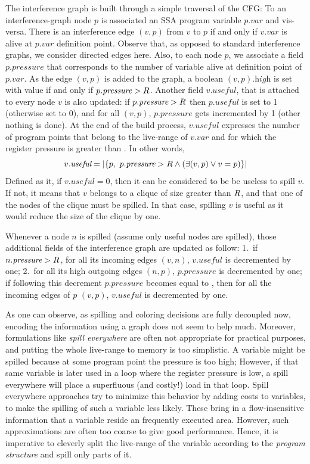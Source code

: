 {The interference graph is built through a simple traversal of the CFG: 
To an interference-graph node $p$ is associated an SSA program variable $p.\textit{var}$ and vis-versa. 
There is an interference edge $(v,p)$ from $v$ to $p$ if and only if $v.\textit{var}$ is alive at $p.\textit{var}$ definition point. 
Observe that, as opposed to standard interference graphs, we consider directed edges here. 
Also, to each node $p$, we associate a field $p.\textit{pressure}$ that corresponds to the number of variable alive at definition point of $p.\textit{var}$. 
As the edge $(v,p)$ is added to the graph, a boolean $(v,p).\textit{high}$ is set with value \true if and only if $p.\textit{pressure}>R$. 
Another field $v.\textit{useful}$, that is attached to every node $v$ is also updated: 
if $p.\textit{pressure}>R$ then $p.\textit{useful}$ is set to 1 (otherwise set to 0), and for all $(v,p)$, $p.\textit{pressure}$ gets incremented by 1 (other nothing is done). 
At the end of the build process, $v.\textit{useful}$ expresses the number of program points that belong to the live-range of $v.\textit{var}$ and for which the register pressure is greater than \regs. 
In other words,
$$v.\textit{useful}=\left|\lbrace p,\ p.\textit{pressure}>\regs \wedge\left(\exists (v,p) \vee v=p \right) \rbrace\right|$$
Defined as it, if $v.\textit{useful}=0$, then it can be considered to be be useless to spill $v$.
If not, it means that $v$ belongs to a clique of size greater than $R$, and that one of the nodes of the clique must be spilled. 
In that case, spilling $v$ is useful as it would reduce the size of the clique by one.

Whenever a node $n$ is spilled (assume only useful nodes are spilled), those additional fields of the interference graph are updated as follow:
1.~if $n.\textit{pressure}>R$, for all its incoming edges $(v,n)$, $v.\textit{useful}$ is decremented by one;
2.~for all its high outgoing edges $(n,p)$, $p.\textit{pressure}$ is decremented by one; if following this decrement $p.\textit{pressure}$ becomes equal to \regs, then for all the incoming edges of $p$ $(v,p)$, $v.\textit{useful}$ is decremented by one.

As one can observe, as spilling and coloring decisions are fully decoupled now, encoding the information using a graph does not seem to help much. 
Moreover, formulations like \emph{spill everywhere} are often not appropriate for practical purposes, and putting the whole live-range to memory is too simplistic. 
A variable might be spilled because at some program point the pressure is too high; 
However, if that same variable is later used in a loop where the register pressure is low, a spill everywhere will place a superfluous (and costly!) load in that loop. 
Spill everywhere approaches try to minimize this behavior by adding costs to variables, to make the spilling of such a variable less likely. 
These bring in a flow-insensitive information that a variable reside an frequently executed area. 
However, such approximations are often too coarse to give good performance. 
Hence, it is imperative to cleverly split the live-range of the variable according to the \emph{program structure} and spill only parts of it.


}
